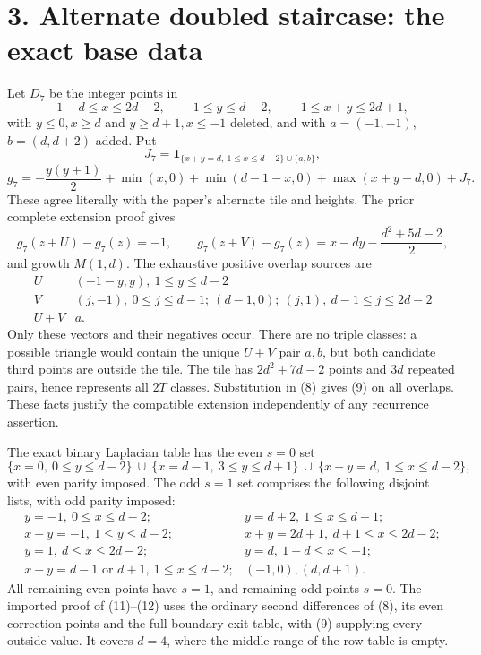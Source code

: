 \documentclass[11pt]{article}
\newcommand{\ind}{\mathbf1}
\begin{document}
\section*{3. Alternate doubled staircase: the exact base data}
Let $D_7$ be the integer points in
\[
 1-d\le x\le2d-2,\quad-1\le y\le d+2,\quad-1\le x+y\le2d+1,
\]
with $y\le0,x\ge d$ and $y\ge d+1,x\le-1$ deleted, and with
$a=(-1,-1)$, $b=(d,d+2)$ added. Put
\[
 J_7=\ind_{\{x+y=d,\ 1\le x\le d-2\}\cup\{a,b\}},
\]\[
 g_7=-\frac{y(y+1)}2+\min(x,0)+\min(d-1-x,0)
                  +\max(x+y-d,0)+J_7.                     \tag{8}
\]
These agree literally with the paper's alternate tile and heights.
The prior complete extension proof gives
\[
 g_7(z+U)-g_7(z)=-1,\qquad
 g_7(z+V)-g_7(z)=x-dy-\frac{d^2+5d-2}{2},                 \tag{9}
\]
and growth $M(1,d)$. The exhaustive positive overlap sources are
\[
\begin{array}{c|l}
U&(-1-y,y),\ 1\le y\le d-2\\
V&(j,-1),\ 0\le j\le d-1;\ (d-1,0);\ (j,1),\ d-1\le j\le2d-2\\
U+V&a.
\end{array}                                                   \tag{10}
\]
Only these vectors and their negatives occur. There are no triple classes:
a possible triangle would contain the unique $U+V$ pair $a,b$, but both
candidate third points are outside the tile. The tile has $2d^2+7d-2$
points and $3d$ repeated pairs, hence represents all $2T$ classes.
Substitution in (8) gives (9) on all overlaps. These facts justify the
compatible extension independently of any recurrence assertion.

The exact binary Laplacian table has the even $s=0$ set
\[
 \{x=0,\ 0\le y\le d-2\}\ \cup\
 \{x=d-1,\ 3\le y\le d+1\}\ \cup\
 \{x+y=d,\ 1\le x\le d-2\},                              \tag{11}
\]
with even parity imposed. The odd $s=1$ set comprises the following
disjoint lists, with odd parity imposed:
\[
\begin{array}{ll}
y=-1,\ 0\le x\le d-2;&y=d+2,\ 1\le x\le d-1;\\
x+y=-1,\ 1\le y\le d-2;&x+y=2d+1,\ d+1\le x\le2d-2;\\
y=1,\ d\le x\le2d-2;&y=d,\ 1-d\le x\le-1;\\
x+y=d-1\text{ or }d+1,\ 1\le x\le d-2;&(-1,0),(d,d+1).
\end{array}                                                   \tag{12}
\]
All remaining even points have $s=1$, and remaining odd points $s=0$.
The imported proof of (11)--(12) uses the ordinary second differences
of (8), its even correction points and the full boundary-exit table,
with (9) supplying every outside value. It covers $d=4$, where the
middle range of the row table is empty.
\end{document}
